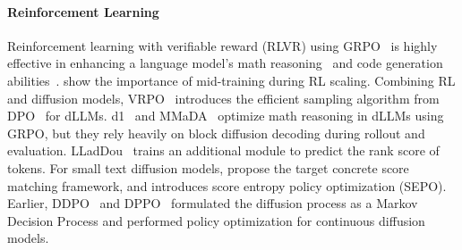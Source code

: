 \paragraph{Reinforcement Learning}
Reinforcement learning with verifiable reward (RLVR) using GRPO~\citep{shao2024deepseekmath,openr1,guo2025deepseek,bercovich2025llama} is highly effective in enhancing a language model's math reasoning~\citep{shao2025spurious} and code generation abilities~\citep{xie2025teaching}. \citet{wang2025octothinker} show the importance of mid-training during RL scaling. Combining RL and diffusion models, VRPO~\citep{li2025llada} introduces the efficient sampling algorithm from DPO~\citep{rafailov2023direct} for dLLMs.
d1~\citep{zhao2025d1} and MMaDA~\citep{yang2025mmada} optimize math reasoning in dLLMs using GRPO, but they rely heavily on block diffusion decoding during rollout and evaluation. LLadDou~\citep{huang2025reinforcing} trains an additional module to predict the rank score of tokens. For small text diffusion models, \citet{zhang2025target} propose the target concrete score matching framework, and \citet{zekri2025fine} introduces score entropy policy optimization (SEPO). Earlier, DDPO~\citep{black2023training} and DPPO~\citep{ren2024diffusion} formulated the diffusion process as a Markov Decision Process and performed policy optimization for continuous diffusion models.

